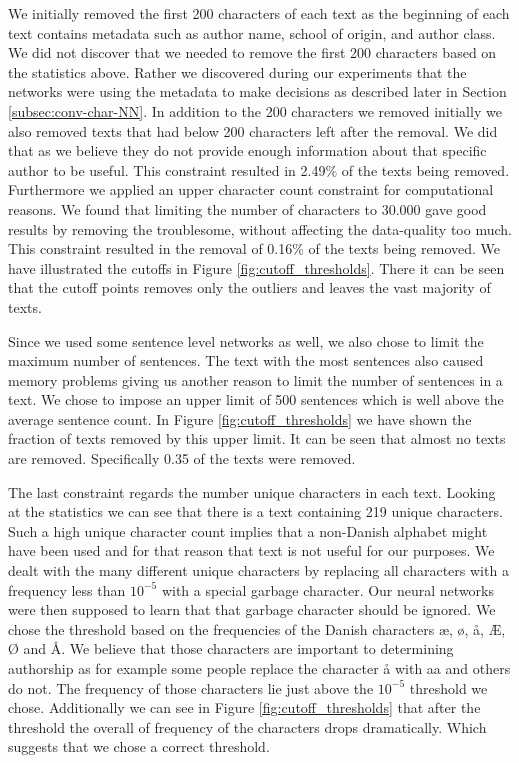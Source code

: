 We initially removed the first 200 characters of each text as the beginning of
each text contains metadata such as author name, school of origin, and author
class. We did not discover that we needed to remove the first 200 characters
based on the statistics above. Rather we discovered during our experiments that
the networks were using the metadata to make decisions as described later in
Section \ref{subsec:conv-char-NN}. In addition to the 200 characters we removed
initially we also removed texts that had below 200 characters left after the
removal. We did that as we believe they do not provide enough information about
that specific author to be useful. This constraint resulted
in 2.49\% of the texts being removed. Furthermore we applied an upper character
count constraint for computational reasons. We found that limiting the number
of characters to 30.000 gave good results by removing the troublesome, without
affecting the data-quality too much. This constraint resulted in the removal of
0.16\% of the texts being removed. We have illustrated the cutoffs in Figure
\ref{fig:cutoff_thresholds}. There it can be seen that the cutoff points removes
only the outliers and leaves the vast majority of texts.

Since we used some sentence level networks as well, we also chose to limit
the maximum number of sentences. The text with the most sentences also caused
memory problems giving us another reason to limit the number of sentences in a
text. We chose to impose an upper limit of 500 sentences which is well above the
average sentence count. In Figure \ref{fig:cutoff_thresholds} we have shown the
fraction of texts removed by this upper limit. It can be seen that almost no
texts are removed. Specifically 0.35 \textperthousand of the texts were removed.

The last constraint regards the number unique characters in each text. Looking
at the statistics we can see that there is a text containing 219 unique
characters. Such a high unique character count implies that a non-Danish
alphabet might have been used and for that reason that text is not useful for
our purposes. We dealt with the many different unique characters by replacing
all characters with a frequency less than $10^{-5}$ with a special garbage
character. Our neural networks were then supposed to learn that that garbage
character should be ignored. We chose the threshold based on the frequencies
of the Danish characters æ, ø, å, Æ, Ø and Å. We believe that those
characters are important to determining authorship as for example some people
replace the character å with aa and others do not. The frequency of those
characters lie just above the $10^{-5}$ threshold we chose. Additionally we can
see in Figure \ref{fig:cutoff_thresholds} that after the threshold the overall
of frequency of the characters drops dramatically. Which suggests that we chose
a correct threshold.

